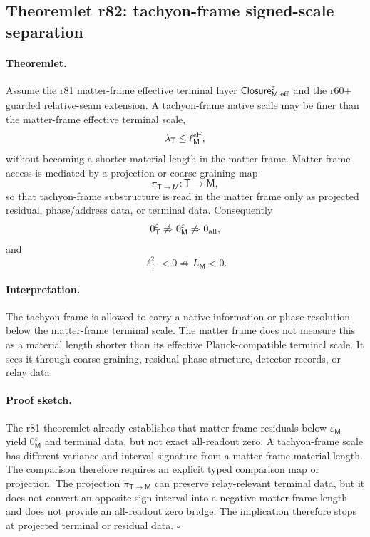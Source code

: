 \subsection*{Theoremlet r82: tachyon-frame signed-scale separation}
\label{subsec:r82-theoremlet-signed-scale-separation}

\paragraph{Theoremlet.}
Assume the r81 matter-frame effective terminal layer
\(\mathsf{Closure}_{\mathsf M,\rm eff}^{\varepsilon}\) and the r60+ guarded relative-seam
extension.  A tachyon-frame native scale may be finer than the matter-frame effective
terminal scale,
\[
\lambda_{\mathsf T}\leq \ell_{\mathsf M}^{\rm eff},
\]
without becoming a shorter material length in the matter frame.  Matter-frame access is
mediated by a projection or coarse-graining map
\[
\pi_{\mathsf T\to\mathsf M}:\mathsf T\to\mathsf M,
\]
so that tachyon-frame substructure is read in the matter frame only as projected residual,
phase/address data, or terminal data.  Consequently
\[
0_{\mathsf T}^{\varepsilon}
\not\Rightarrow
0_{\mathsf M}^{\varepsilon}
\not\Rightarrow
0_{\rm all},
\]
and
\[
\ell_{\mathsf T}^{2}<0
\not\Rightarrow
L_{\mathsf M}<0.
\]

\paragraph{Interpretation.}
The tachyon frame is allowed to carry a native information or phase resolution below the
matter-frame terminal scale.  The matter frame does not measure this as a material length
shorter than its effective Planck-compatible terminal scale.  It sees it through
coarse-graining, residual phase structure, detector records, or relay data.

\paragraph{Proof sketch.}
The r81 theoremlet already establishes that matter-frame residuals below
\(\varepsilon_{\mathsf M}\) yield \(0_{\mathsf M}^{\varepsilon}\) and terminal data, but
not exact all-readout zero.  A tachyon-frame scale has different variance and interval
signature from a matter-frame material length.  The comparison therefore requires an
explicit typed comparison map or projection.  The projection
\(\pi_{\mathsf T\to\mathsf M}\) can preserve relay-relevant terminal data, but it does not
convert an opposite-sign interval into a negative matter-frame length and does not provide
an all-readout zero bridge.  The implication therefore stops at projected terminal or
residual data. \(\square\)

